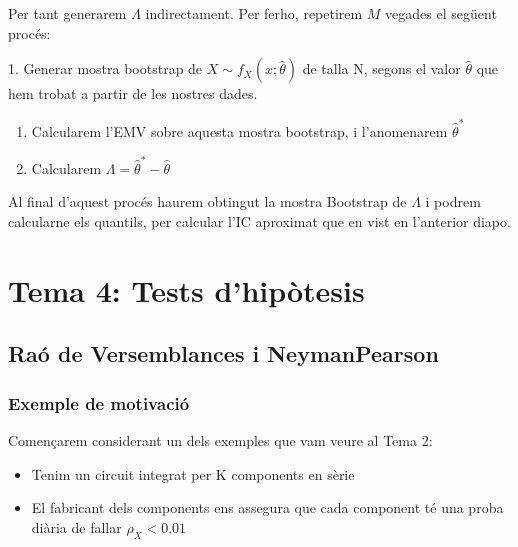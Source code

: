 \documentclass[letterpaper,10pt,english]{sphinxmanual}
\begin{document}
Per tant generarem \(\Lambda\) indirectament. Per fer\sphinxhyphen{}ho, repetirem \(M\) vegades
el següent procés:

1. Generar  mostra bootstrap de \(X \sim f_X(x;\hat{\theta})\) de talla N, segons el valor
\(\hat{\theta}\) que hem trobat a partir de les nostres dades.
\begin{enumerate}
%
\setcounter{enumi}{1}
\item {} 
Calcularem l’EMV sobre aquesta mostra bootstrap, i l’anomenarem \(\hat{\theta}^*\)

\item {} 
Calcularem \(\Lambda = \hat{\theta}^* - \hat{\theta}\)

\end{enumerate}

Al final d’aquest procés haurem obtingut la mostra Bootstrap de \(\Lambda\) i
podrem calcular\sphinxhyphen{}ne els quantils, per calcular l’IC aproximat que en vist en l’anterior diapo.


\chapter{Tema 4: Tests d’hipòtesis}
\label{\detokenize{0_Intro/0_4_Tests:tema-4-tests-d-hipotesis}}\label{\detokenize{0_Intro/0_4_Tests::doc}}

\section{Raó de Versemblances i Neyman\sphinxhyphen{}Pearson}
\label{\detokenize{0_Intro/0_4_Tests:rao-de-versemblances-i-neyman-pearson}}

\subsection{Exemple de motivació}
\label{\detokenize{0_Intro/0_4_Tests:exemple-de-motivacio}}
Començarem considerant un dels exemples que
vam veure al Tema 2:
\begin{itemize}
\item {} 
Tenim un circuit integrat per K components en sèrie

\item {} 
El fabricant dels components ens assegura que cada component té una proba diària de fallar \(\rho_X < 0.01\)

\end{itemize}
\end{document}
